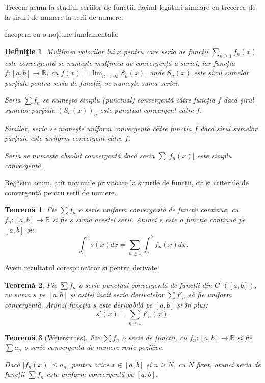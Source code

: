 \documentclass[11pt,a4paper]{article}
\newcommand\ds{\displaystyle}
\newcommand\RR{\mathbb{R}}
\theoremstyle{dotless}
\newtheorem{theorem}{Teorem\u{a}}[section]
\theoremstyle{dotlessdr}
\newtheorem{definition}{Defini\c{t}ie}[section]
\begin{document}
Trecem acum la studiul seriilor de funcții, făcînd legături similare cu trecerea
de la șiruri de numere la serii de numere.

Începem cu o noțiune fundamentală:

\begin{definition}\label{def:pc-uc-serie-f}
  Mulțimea valorilor lui $x$ pentru care seria de funcții $\ds\sum_{n \geq 1} f_n(x)$
  este convergentă se numește \emph{mulțimea de convergență} a seriei, iar funcția
  $f : [a, b] \to \RR$, cu $f(x) = \ds\lim_{n \to \infty} S_n(x)$, unde $S_n(x)$
  este șirul sumelor parțiale pentru seria de funcții, se numește \emph{suma seriei}.

  
  Seria $\sum f_n$ se numește \emph{simplu (punctual) convergentă} către funcția $f$
  dacă șirul sumelor parțiale $(S_n(x))_n$ este punctual convergent către $f$.

  Similar, seria se numește \emph{uniform convergentă} către funcția $f$ dacă șirul
  sumelor parțiale este uniform convergent către $f$.

  Seria se numește \emph{absolut convergentă} dacă seria $\sum |f_n(x)|$ este simplu
  convergentă.
\end{definition}

Regăsim acum, atît noțiunile privitoare la șirurile de funcții, cît și criteriile
de convergență pentru serii de numere.

\begin{theorem}\label{thm:serie-f-integrala}
  Fie $\sum f_n$ o serie uniform convergentă de funcții continue, cu $f_n : [a, b] \to \RR$
  și fie $s$ suma acestei serii. Atunci $s$ este o funcție continuă pe $[a, b]$ și:
  \[
    \int_a^b s(x) dx = \sum_{n \geq 1} \int_a^b f_n(x) dx.
  \]
\end{theorem}

Avem rezultatul corespunzător și pentru derivate:

\begin{theorem}\label{thm:serie-f-derivata}
  Fie $\sum f_n$ o serie punctual convergentă de funcții din $C^1([a, b])$, cu suma $s$
  pe $[a, b]$ și astfel încît seria derivatelor $\sum f'_n$ să fie uniform convergentă.
  Atunci funcția $s$ este derivabilă pe $[a, b]$ și în plus:
  \[
    s'(x) = \sum_{n \geq 1} f'_n(x).
  \]
\end{theorem}

\begin{theorem}[Weierstrass]\label{thm:weierstrass-serii-f}
  Fie $\sum f_n$ o serie de funcții, cu $f_n : [a, b] \to \RR$ și fie $\sum a_n$ o serie
  convergentă de numere reale pozitive.

  Dacă $|f_n(x)| \leq a_n$, pentru orice $x \in [a, b]$ și $n \geq N$, cu $N$ fixat,
  atunci seria de funcții $\sum f_n$ este uniform convergentă pe $[a, b]$.
\end{theorem}
\end{document}
